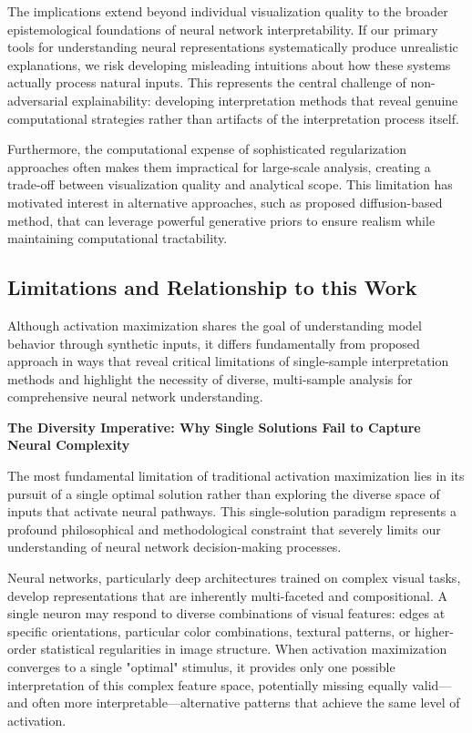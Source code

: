 \documentclass[licencjacka,en]{pracamgr}
\begin{document}
The implications extend beyond individual visualization quality to the broader epistemological foundations of neural network interpretability. If our primary tools for understanding neural representations systematically produce unrealistic explanations, we risk developing misleading intuitions about how these systems actually process natural inputs. This represents the central challenge of non-adversarial explainability: developing interpretation methods that reveal genuine computational strategies rather than artifacts of the interpretation process itself.

Furthermore, the computational expense of sophisticated regularization approaches often makes them impractical for large-scale analysis, creating a trade-off between visualization quality and analytical scope. This limitation has motivated interest in alternative approaches, such as proposed diffusion-based method, that can leverage powerful generative priors to ensure realism while maintaining computational tractability.

\subsection{Limitations and Relationship to this Work}

Although activation maximization shares the goal of understanding model behavior through synthetic inputs, it differs fundamentally from proposed approach in ways that reveal critical limitations of single-sample interpretation methods and highlight the necessity of diverse, multi-sample analysis for comprehensive neural network understanding.

\textbf{The Diversity Imperative: Why Single Solutions Fail to Capture Neural Complexity}

The most fundamental limitation of traditional activation maximization lies in its pursuit of a single optimal solution rather than exploring the diverse space of inputs that activate neural pathways. This single-solution paradigm represents a profound philosophical and methodological constraint that severely limits our understanding of neural network decision-making processes.

Neural networks, particularly deep architectures trained on complex visual tasks, develop representations that are inherently multi-faceted and compositional. A single neuron may respond to diverse combinations of visual features: edges at specific orientations, particular color combinations, textural patterns, or higher-order statistical regularities in image structure. When activation maximization converges to a single "optimal" stimulus, it provides only one possible interpretation of this complex feature space, potentially missing equally valid—and often more interpretable—alternative patterns that achieve the same level of activation.
\end{document}
